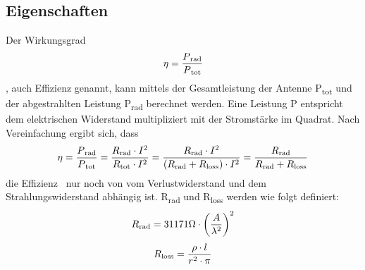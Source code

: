 \subsection{Eigenschaften\label{antennen:antennenEigenschaften}}
Der Wirkungsgrad
\begin{equation}
	\eta=\frac{P\textsubscript{rad}}{P\textsubscript{tot}}
	\label{antennen:Wirkungsgrad}
\end{equation}
, auch Effizienz genannt, kann mittels der Gesamtleistung der Antenne P\textsubscript{tot} und der abgestrahlten Leistung P\textsubscript{rad} berechnet werden. Eine Leistung P entspricht dem elektrischen Widerstand multipliziert mit der Stromstärke im Quadrat. Nach Vereinfachung ergibt sich, dass
\begin{equation}
	\eta=\frac{P\textsubscript{rad}}{P\textsubscript{tot}}=\frac{R\textsubscript{rad}\cdot{I^2}}{R\textsubscript{tot}\cdot{I^2}}=\frac{R\textsubscript{rad}\cdot{I^2}}{(R\textsubscript{rad}+R\textsubscript{loss})\cdot{I^2}}=\frac{R\textsubscript{rad}}{R\textsubscript{rad}+R\textsubscript{loss}}
	\label{antennen:Wirkungsgradkomplett}
\end{equation}
die Effizienz \texteta\ nur noch von vom Verlustwiderstand und dem Strahlungswiderstand abhängig ist. R\textsubscript{rad} und R\textsubscript{loss} werden wie folgt definiert:
\begin{equation}
	R\textsubscript{rad}=31171\Omega\cdot{\bigg(\frac{A}{\lambda^2}\bigg)^2}
	\label{antennen:Rrad}
\end{equation}
\begin{equation}
	R\textsubscript{loss}=\frac{\rho\cdot{l}}{r^2\cdot{\pi}}
	\label{antennen:Rloss}
\end{equation}

